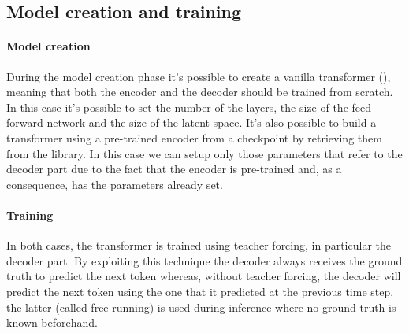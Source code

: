 \subsection{Model creation and training}

\paragraph{Model creation} During the model creation phase it's possible to create a vanilla transformer (\cite{vaswani2017attention}), meaning that both the encoder and the decoder should be trained from scratch. In this case it's possible to set the number of the layers, the size of the feed forward network and the size of the latent space. It's also possible to build a transformer using a pre-trained encoder from a checkpoint by retrieving them from the \cite{huggingface_co} library. In this case we can setup only those parameters that refer to the decoder part due to the fact that the encoder is pre-trained and, as a consequence, has the parameters already set.

\paragraph{Training}In both cases, the transformer is trained using teacher forcing, in particular the decoder part. By exploiting this technique the decoder always receives the ground truth to predict the next token whereas, without teacher forcing, the decoder will predict the next token using the one that it predicted at the previous time step, the latter (called free running) is used during inference where no ground truth is known beforehand.

